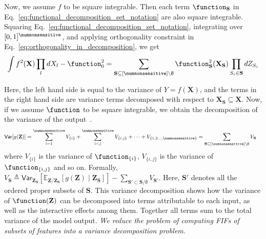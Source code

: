 Now, we assume $ f $ to be square integrable. Then each term $ \function_{\mathbf{S}} $ in Eq.~\eqref{eq:functional_decomposition_set_notation} are also square integrable. Squaring Eq.~\eqref{eq:functional_decomposition_set_notation}, integrating over $  [0,1]^\numnonsensitive$, and applying orthogonality constraint in Eq.~\ref{eq:orthogonality_in_decomposition}, we get
\begin{align*}
	\int f^2(\mathbf{X})\prod_l dX_l - \function_0^2 = \sum_{\mathbf{S} \subseteq [\numnonsensitive] \setminus \emptyset}  \function_{\mathbf{S}}^2(\mathbf{X}_{\mathbf{S}}) \prod_{S_i \in \mathbf{S}} d Z_{S_i}
\end{align*}

Here, the left hand side is equal to the variance of $ Y = f(\mathbf{X}) $, and the terms in the right hand side are variance terms decomposed with respect to  $ \mathbf{X}_{\mathbf{S}} \subseteq \mathbf{X} $. 
\fi
Now, if we assume $ \function $ to be square integrable, we obtain the decomposition of the variance of the output~\cite{sobol1990sensitivity}.
\begin{align}\label{eq:variance_decomposition_set_notation}
	\mathsf{Var}[g(\mathbf{Z})] &= \sum_{i=1}^{\numnonsensitive}V_{\{i\}} +  \sum_{i<j}^{\numnonsensitive} V_{\{i,j\}}  + \cdots  + V_{\{1, 2\dots, \numnonsensitive\}}= \sum_{\mathbf{S} \subseteq [\numnonsensitive] \setminus \emptyset} V_{\mathbf{S}} 
\end{align}
where $ V_{\{i\}} $ is the variance of $ \function_{\{i\}} $, $ V_{\{i,j\}} $ is the variance of $ \function_{\{i,j\}} $ and so on. Formally,  $V_{\mathbf{S}} \triangleq \mathsf{Var} _{\mathbf{Z}_{\mathbf{S}}}\left[\mathbb{E}_{{\textbf {Z}}/\mathbf{Z}_{\mathbf{S}}}[g(\mathbf{Z})\mid \mathbf{Z}_{\mathbf{S}}]\right]- \sum_{\mathbf{S}' \subset \mathbf{S}/\emptyset}{V} _{\mathbf{S}'}$. Here, $\mathbf{S}'$ denotes all the ordered proper subsets of $\mathbf{S}$. %
This variance decomposition shows how the variance of $\function(\mathbf{Z}) $ can be decomposed into terms attributable to each input, as well as the interactive effects among them. Together all terms sum to the total variance of the model output. 
\textit{We reduce the problem of computing FIFs of subsets of features into a variance decomposition problem.}

\iffalse

